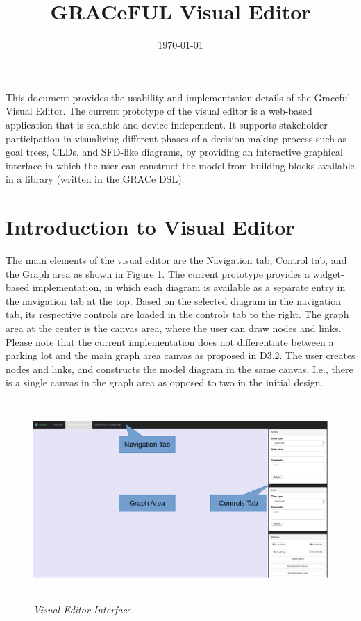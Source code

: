 \documentclass[a4paper]{article}
\title{GRACeFUL Visual Editor}
\date{\today}
\begin{document}
\maketitle
This document provides the usability and implementation details of the Graceful Visual Editor. The current prototype of the visual editor is a web-based application that is scalable and device independent. It supports stakeholder participation in visualizing different phases of a decision making process such as goal trees, CLDs, and SFD-like diagrams, by providing an interactive graphical interface in which the user can construct the model from building blocks available in a library (written in the GRACe DSL). 

\section{Introduction to Visual Editor}
The main elements of the visual editor are the Navigation tab, Control tab, and the Graph area as shown in Figure \ref{fig:layout}. The current prototype provides a widget-based implementation, in which each diagram is available as a separate entry in the navigation tab at the top. Based on the selected diagram in the navigation tab, its respective controls are loaded in the controls tab to the right. The graph area at the center is the canvas area, where the user can draw nodes and links. Please note that the current implementation does not differentiate between a parking lot and the main graph area canvas as proposed in D3.2. The user creates nodes and links, and constructs the model diagram in the same canvas. I.e., there is a single canvas in the graph area as opposed to two in the initial design.

\begin{figure}
\begin{center}
\includegraphics[height=3in,width=5in]{img/layout.png}
\caption{\small \sl Visual Editor Interface.\label{fig:layout}}
\end{center}
\end{figure}
\end{document}
